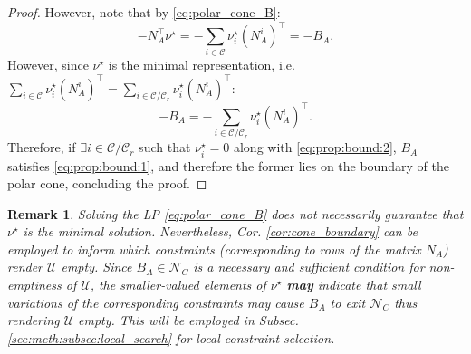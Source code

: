 \documentclass[letterpaper, 10 pt, conference]{ieeeconf}  %
\newtheorem{remark}{\textbf{Remark}}
\begin{document}
{\begin{proof}
However, note that by \eqref{eq:polar_cone_B}:
\begin{equation}
    -N_A^\top \nu^\star = -\sum_{i\in\mathcal{C}}\nu_i^\star (N_A^i)^\top = -B_A.
\end{equation}
However, since $\nu^\star $ is the minimal representation, i.e. $\sum_{i\in\mathcal{C}}\nu_i^\star (N_A^i)^\top = \sum_{i\in\mathcal{C}/\mathcal{C}_r}\nu_i^\star (N_A^i)^\top$:
\begin{equation}\label{eq:prop:bound:2}
     -B_A = -\sum_{i\in\mathcal{C}/\mathcal{C}_r}\nu_i^\star (N_A^i)^\top.
\end{equation}
Therefore, if $\exists i \in \mathcal{C}/\mathcal{C}_r$ such that $\nu^\star_i = 0 $ along with \eqref{eq:prop:bound:2}, $B_A$ satisfies \eqref{eq:prop:bound:1}, and therefore the former lies on the boundary of the polar cone, concluding the proof. 
\end{proof}
}
{
\color{blue}
\begin{remark}
    Solving the LP \eqref{eq:polar_cone_B} does not necessarily guarantee that $\nu^\star$ is the minimal solution. Nevertheless, Cor. \ref{cor:cone_boundary} can be employed to inform which constraints (corresponding to rows of the matrix $N_A$) render $\mathcal{U}$ empty. Since $B_A \in \mathcal{N}_C$ is a necessary and sufficient condition for non-emptiness of $\mathcal{U}$, the smaller-valued elements of $\nu^\star$ \textbf{may} indicate that small variations of the corresponding constraints may cause $B_A$ to exit $\mathcal{N}_C$ thus rendering $\mathcal{U}$ empty. This will be employed in Subsec. \ref{sec:meth:subsec:local_search} for local constraint selection. 
\end{remark}
}
\end{document}
